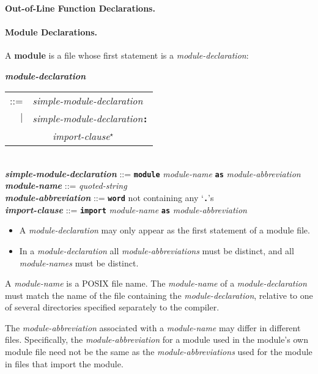\documentclass[12pt]{article}
\newcommand{\subsubsubsection}[1]{\paragraph[#1]{#1.}}
\newcommand{\TT}[1]{{\tt \bfseries #1}}
\newcommand{\STAR}{{\Large $^\star$}}
\newcommand{\key}[1]{{\rm \bfseries #1}}
\newcommand{\ttkey}[1]{{\tt \bfseries #1}}
\newcommand{\emkey}[1]{{\em \bfseries #1}}
\newenvironment{indpar}[1][0.3in]%
	{\begin{list}{}%
		     {\setlength{\itemsep}{0in}%
		      \setlength{\topsep}{0in}%
		      \setlength{\parsep}{1ex}%
		      \setlength{\labelwidth}{#1}%
		      \setlength{\leftmargin}{#1}%
		      \addtolength{\leftmargin}{\labelsep}}%
	 \item}%
	{\end{list}}
\begin{document}
\subsubsubsection{Out-of-Line Function Declarations}
\label{OUT-OF-LINE-FUNCTION-DECLARATIONS}

\subsubsubsection{Module Declarations}
\label{MODULE-DECLARATIONS}

A \key{module} is a file whose first statement is a {\em module-declaration}:

\begin{indpar}
\emkey{module-declaration}\label{MODULE-DECLARATION}
    \begin{tabular}[t]{rl}
    ::= & {\em simple-module-declaration} \\
    $|$ & {\em simple-module-declaration}\TT{:} \\
	& \TT{~~~~}{\em import-clause}\STAR{} \\
    \end{tabular} \\
\emkey{simple-module-declaration} ::= \TT{module} {\em module-name}
        \TT{as} {\em module-abbreviation} \\
\emkey{module-name}\label{MODULE-NAME} ::= {\em quoted-string} \\
\emkey{module-abbreviation}\label{MODULE-ABBREVIATION}
	::= \TT{word} not containing any `\TT{.}'s \\
\emkey{import-clause}\label{IMPORT-CLAUSE}
    ::= \ttkey{import} {\em module-name} \TT{as} {\em module-abbreviation}

\begin{itemize}

\item
A {\em module-declaration} may only appear as the first statement
of a module file.

\item
In a {\em module-declaration} all {\em module-abbreviations} must be
distinct, and all {\em module-names} must be distinct.
\end{itemize}
\end{indpar}

A {\em module-name} is a POSIX file name.
The {\em module-name} of a {\em module-declaration} must match the
name of the file containing the
{\em module-declaration}, relative to one of several directories
specified separately to the compiler.

The {\em module-abbreviation} associated with a {\em module-name}
may differ in different files.  Specifically, the {\em module-abbreviation}
for a module used in the module's own module file need not be the same
as the {\em module-abbreviations} used for the module in files
that import the module.
\end{document}
